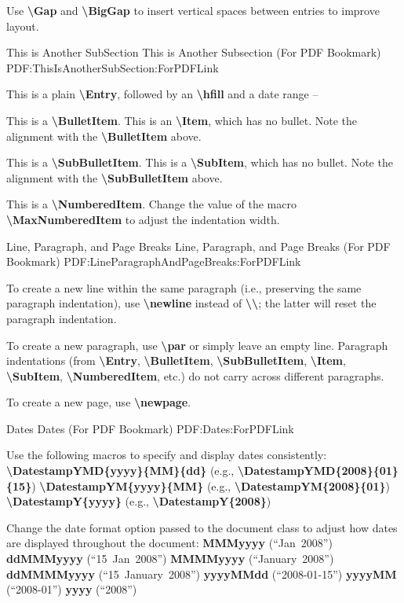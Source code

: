 \documentclass[letterpaper,MMMyyyy,nonstopmode]{simpleresumecv}
\newcommand{\Code}[1]{\mbox{\textbf{#1}}}
\newcommand{\CodeCommand}[1]{\mbox{\textbf{\textbackslash{#1}}}}
\begin{document}
\begin{Body}
\Gap
\BulletItem
Use \CodeCommand{Gap} and \CodeCommand{BigGap} to insert vertical spaces between entries to improve layout.

\BigGap
\SubSection
{This is Another SubSection}
{This is Another Subsection (For PDF Bookmark)}
{PDF:ThisIsAnotherSubSection:ForPDFLink}

\Gap
\Entry
This is a plain \CodeCommand{Entry},
followed by an \CodeCommand{hfill} and a date range
\hfill
{} --

\Gap
\BulletItem
This is a \CodeCommand{BulletItem}.
\Item
This is an \CodeCommand{Item}, which has no bullet.
Note the alignment with the \CodeCommand{BulletItem} above.

\Gap
\SubBulletItem
This is a \CodeCommand{SubBulletItem}.
\SubItem
This is a \CodeCommand{SubItem}, which has no bullet.
Note the alignment with the \CodeCommand{SubBulletItem} above.

\Gap
\NumberedItem{[42]}
This is a \CodeCommand{NumberedItem}.
Change the value of the macro \CodeCommand{MaxNumberedItem} to adjust the indentation width.

\BigGap
\SubSection
{Line, Paragraph, and Page Breaks}
{Line, Paragraph, and Page Breaks (For PDF Bookmark)}
{PDF:LineParagraphAndPageBreaks:ForPDFLink}

\Gap
\BulletItem
To create a new line within the same paragraph (i.e., preserving the same paragraph indentation), use \CodeCommand{newline} instead of \CodeCommand{\textbackslash};
the latter will reset the paragraph indentation.

\Gap
\BulletItem
To create a new paragraph, use \CodeCommand{par} or simply leave an empty line.
Paragraph indentations (from
\CodeCommand{Entry},
\CodeCommand{BulletItem},
\CodeCommand{SubBulletItem},
\CodeCommand{Item},
\CodeCommand{SubItem},
\CodeCommand{NumberedItem},
etc.) do not carry across different paragraphs.

\Gap
\BulletItem
To create a new page, use \CodeCommand{newpage}.

\BigGap
\SubSection
{Dates}
{Dates (For PDF Bookmark)}
{PDF:Dates:ForPDFLink}

\Gap
\BulletItem
Use the following macros to specify and display dates consistently:
\SubBulletItem
\CodeCommand{DatestampYMD\{yyyy\}\{MM\}\{dd\}}
(e.g., \CodeCommand{DatestampYMD\{2008\}\{01\}\{15\}})
\SubBulletItem
\CodeCommand{DatestampYM\{yyyy\}\{MM\}}
(e.g., \CodeCommand{DatestampYM\{2008\}\{01\}})
\SubBulletItem
\CodeCommand{DatestampY\{yyyy\}}
(e.g., \CodeCommand{DatestampY\{2008\}})

\Gap
\BulletItem
Change the date format option passed to the document class to adjust how dates are displayed throughout the document:
\SubBulletItem
\Code{MMMyyyy} (``Jan~2008'')
\SubBulletItem
\Code{ddMMMyyyy} (``15~Jan~2008'')
\SubBulletItem
\Code{MMMMyyyy} (``January~2008'')
\SubBulletItem
\Code{ddMMMMyyyy} (``15~January~2008'')
\SubBulletItem
\Code{yyyyMMdd} (``2008-01-15'')
\SubBulletItem
\Code{yyyyMM} (``2008-01'')
\SubBulletItem
\Code{yyyy} (``2008'')

\endgroup

\fi

\end{Body}
\end{document}
